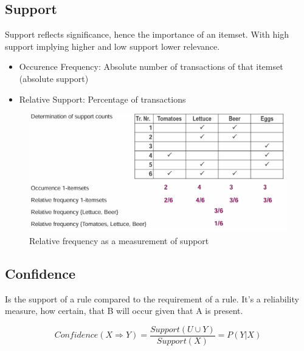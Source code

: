 \documentclass[../Main.tex]{subfiles}
\begin{document}
\subsection{Support}
Support reflects significance, hence the importance of an itemset.
With high support implying higher and low support lower relevance.
\begin{itemize}
    \item Occurence Frequency: Absolute number of transactions of that itemset (absolute support)
    \item Relative Support: Percentage of transactions
\end{itemize}
\begin{figure}[H]
    \centering
    \includegraphics[width=0.75\linewidth]{Images/datan/relative-frequency.png}
    \caption{Relative frequency as a measurement of support}
\end{figure}

\subsection{Confidence}
Is the support of a rule compared to the requirement of a rule.
It's a reliability measure, how certain, that B will occur given that A is present.
\begin{figure}[H]
    \begin{equation}
        Confidence(X \Rightarrow Y) = \frac{Support(U \cup Y)}{Support(X)} = P(Y|X)
    \end{equation}
\end{figure}
\end{document}
